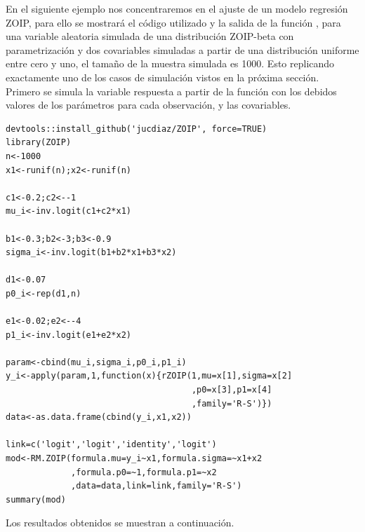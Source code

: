 En el siguiente ejemplo nos concentraremos en el ajuste de un modelo regresi\'{o}n ZOIP, para ello se mostrar\'{a} el c\'{o}digo utilizado y la salida de la funci\'{o}n , para una variable aleatoria simulada de una distribuci\'{o}n ZOIP-beta con parametrizaci\'{o}n \cite{Stasinopoulos2} y dos covariables simuladas a partir de una distribuci\'{o}n uniforme entre cero y uno, el tama\~{n}o de la muestra simulada es 1000. Esto replicando exactamente uno de los casos de simulaci\'{o}n vistos en la pr\'{o}xima secci\'{o}n.\\

Primero se simula la variable respuesta a partir de la funci\'{o}n  con los debidos valores de los par\'{a}metros para cada observaci\'{o}n, y las covariables.

\begin{verbatim}
devtools::install_github('jucdiaz/ZOIP', force=TRUE)
library(ZOIP)
n<-1000
x1<-runif(n);x2<-runif(n)

c1<-0.2;c2<--1
mu_i<-inv.logit(c1+c2*x1)

b1<-0.3;b2<-3;b3<-0.9
sigma_i<-inv.logit(b1+b2*x1+b3*x2)

d1<-0.07
p0_i<-rep(d1,n)

e1<-0.02;e2<--4
p1_i<-inv.logit(e1+e2*x2)

param<-cbind(mu_i,sigma_i,p0_i,p1_i)
y_i<-apply(param,1,function(x){rZOIP(1,mu=x[1],sigma=x[2]
                                     ,p0=x[3],p1=x[4]
                                     ,family='R-S')})
data<-as.data.frame(cbind(y_i,x1,x2))

link=c('logit','logit','identity','logit')
mod<-RM.ZOIP(formula.mu=y_i~x1,formula.sigma=~x1+x2
             ,formula.p0=~1,formula.p1=~x2
             ,data=data,link=link,family='R-S')
summary(mod)
\end{verbatim}

Los resultados obtenidos se muestran a continuaci\'{o}n.


